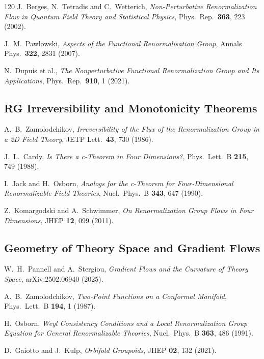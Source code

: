 \documentclass[11pt, twoside, openright]{book}
\theoremstyle{dotted}
\theoremstyle{definition}
\begin{document}
\begin{thebibliography}{120}
J.~Berges, N.~Tetradis and C.~Wetterich,
\textit{Non-Perturbative Renormalization Flow in Quantum Field Theory and Statistical Physics},
Phys.\ Rep.\ \textbf{363}, 223 (2002).

J.~M.~Pawlowski,
\textit{Aspects of the Functional Renormalisation Group},
Annals Phys.\ \textbf{322}, 2831 (2007).

N.~Dupuis et al.,
\textit{The Nonperturbative Functional Renormalization Group and Its Applications},
Phys.\ Rep.\ \textbf{910}, 1 (2021).

\subsection*{RG Irreversibility and Monotonicity Theorems}

A.~B.~Zamolodchikov,
\textit{Irreversibility of the Flux of the Renormalization Group in a 2D Field Theory},
JETP Lett.\ \textbf{43}, 730 (1986).

J.~L.~Cardy,
\textit{Is There a c-Theorem in Four Dimensions?},
Phys.\ Lett.\ B \textbf{215}, 749 (1988).

I.~Jack and H.~Osborn,
\textit{Analogs for the c-Theorem for Four-Dimensional Renormalizable Field Theories},
Nucl.\ Phys.\ B \textbf{343}, 647 (1990).

Z.~Komargodski and A.~Schwimmer,
\textit{On Renormalization Group Flows in Four Dimensions},
JHEP \textbf{12}, 099 (2011).

\subsection*{Geometry of Theory Space and Gradient Flows}

W.~H.~Pannell and A.~Stergiou,
\textit{Gradient Flows and the Curvature of Theory Space},
arXiv:2502.06940 (2025).

A.~B.~Zamolodchikov,
\textit{Two-Point Functions on a Conformal Manifold},
Phys.\ Lett.\ B \textbf{194}, 1 (1987).

H.~Osborn,
\textit{Weyl Consistency Conditions and a Local Renormalization Group Equation for General Renormalizable Theories},
Nucl.\ Phys.\ B \textbf{363}, 486 (1991).

D.~Gaiotto and J.~Kulp,
\textit{Orbifold Groupoids},
JHEP \textbf{02}, 132 (2021).


\end{thebibliography}
\end{document}
